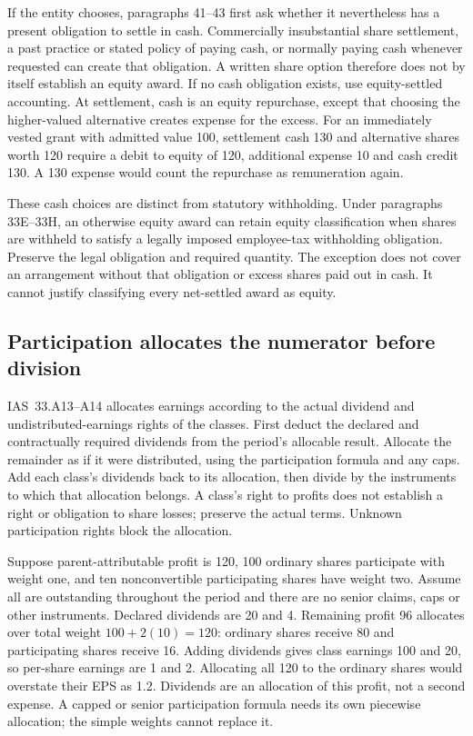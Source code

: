 If the entity chooses, paragraphs 41--43 first ask whether it nevertheless has a present obligation to settle in cash. Commercially insubstantial share settlement, a past practice or stated policy of paying cash, or normally paying cash whenever requested can create that obligation. A written share option therefore does not by itself establish an equity award. If no cash obligation exists, use equity-settled accounting. At settlement, cash is an equity repurchase, except that choosing the higher-valued alternative creates expense for the excess. For an immediately vested grant with admitted value 100, settlement cash 130 and alternative shares worth 120 require a debit to equity of 120, additional expense 10 and cash credit 130. A 130 expense would count the repurchase as remuneration again.

These cash choices are distinct from statutory withholding. Under paragraphs 33E--33H, an otherwise equity award can retain equity classification when shares are withheld to satisfy a legally imposed employee-tax withholding obligation. Preserve the legal obligation and required quantity. The exception does not cover an arrangement without that obligation or excess shares paid out in cash. It cannot justify classifying every net-settled award as equity.

\hypertarget{participation-allocates-the-numerator-before-division}{%
\subsection{Participation allocates the numerator before division}\label{participation-allocates-the-numerator-before-division}}

IAS~33.A13--A14 \citep[IAS~33.A13--A16]{eu20231803} allocates earnings according to the actual dividend and undistributed-earnings rights of the classes. First deduct the declared and contractually required dividends from the period's allocable result. Allocate the remainder as if it were distributed, using the participation formula and any caps. Add each class's dividends back to its allocation, then divide by the instruments to which that allocation belongs. A class's right to profits does not establish a right or obligation to share losses; preserve the actual terms. Unknown participation rights block the allocation.

Suppose parent-attributable profit is 120, 100 ordinary shares participate with weight one, and ten nonconvertible participating shares have weight two. Assume all are outstanding throughout the period and there are no senior claims, caps or other instruments. Declared dividends are 20 and 4. Remaining profit 96 allocates over total weight \(100+2(10)=120\): ordinary shares receive 80 and participating shares receive 16. Adding dividends gives class earnings 100 and 20, so per-share earnings are 1 and 2. Allocating all 120 to the ordinary shares would overstate their EPS as 1.2. Dividends are an allocation of this profit, not a second expense. A capped or senior participation formula needs its own piecewise allocation; the simple weights cannot replace it.

